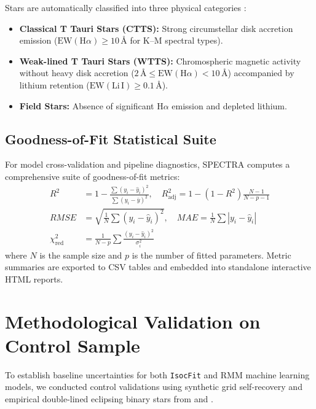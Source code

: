 \documentclass[preprints,article,submit,moreauthors,pdftex]{Definitions/mdpi}
\begin{document}
Stars are automatically classified into three physical categories \citep{herczeg2015empirical}:
\begin{itemize}
    \item \textbf{Classical T Tauri Stars (CTTS):} Strong circumstellar disk accretion emission ($\text{EW}(\text{H}\alpha) \ge 10\,\text{\AA}$ for K--M spectral types).
    \item \textbf{Weak-lined T Tauri Stars (WTTS):} Chromospheric magnetic activity without heavy disk accretion ($2\,\text{\AA} \le \text{EW}(\text{H}\alpha) < 10\,\text{\AA}$) accompanied by lithium retention ($\text{EW}(\text{Li}\,\text{I}) \ge 0.1\,\text{\AA}$).
    \item \textbf{Field Stars:} Absence of significant $\text{H}\alpha$ emission and depleted lithium.
\end{itemize}


\subsection{Goodness-of-Fit Statistical Suite}
\label{sec:gof}

For model cross-validation and pipeline diagnostics, \textsc{SPECTRA} computes a comprehensive suite of goodness-of-fit metrics:
\begin{align}
    R^2 &= 1 - \frac{\sum (y_i - \hat{y}_i)^2}{\sum (y_i - \bar{y})^2}, \quad R^2_{\text{adj}} = 1 - (1 - R^2)\frac{N - 1}{N - p - 1} \label{eq:r2} \\
    RMSE &= \sqrt{\frac{1}{N}\sum (y_i - \hat{y}_i)^2}, \quad MAE = \frac{1}{N}\sum |y_i - \hat{y}_i| \label{eq:rmse} \\
    \chi^2_{\text{red}} &= \frac{1}{N - p}\sum \frac{(y_i - \hat{y}_i)^2}{\sigma_i^2} \label{eq:chi2}
\end{align}
where $N$ is the sample size and $p$ is the number of fitted parameters. Metric summaries are exported to CSV tables and embedded into standalone interactive HTML reports.


\section{Methodological Validation on Control Sample}
\label{sec:validation}

To establish baseline uncertainties for both \texttt{IsocFit} and RMM machine learning models, we conducted control validations using synthetic grid self-recovery and empirical double-lined eclipsing binary stars from \citet{delfosse2000accurate} and \citet{benedict2016solar}.
\end{document}
